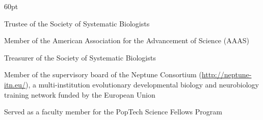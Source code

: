 \begin{entry}{60pt}
\item [\rm 2019-2021] Trustee of the Society of Systematic Biologists
\item [\rm 2018--present] Member of the American Association for the Advancement of Science (AAAS)
\item [\rm 2016-2018] Treasurer of the Society of Systematic Biologists
\item [\rm 2013-2016] Member of the supervisory board of the Neptune Consortium (\url{http://neptune-itn.eu/}), a multi-institution evolutionary developmental biology and neurobiology training network funded by the European Union
\item [\rm 2012] Served as a faculty member for the PopTech Science Fellows Program

\end{entry}

